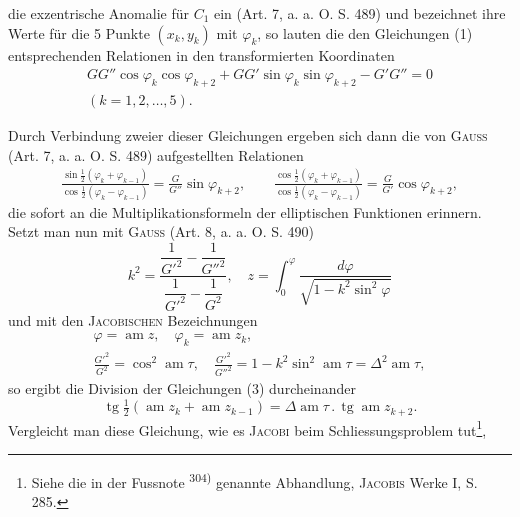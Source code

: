 die exzentrische Anomalie für \(C_1\) ein (Art. 7, a. a. O. S. 489) und bezeichnet
ihre Werte für die 5 Punkte \((x_k,y_k)\) mit \(\varphi_k\), so lauten die den Gleichungen
(1) entsprechenden Relationen in den transformierten Koordinaten
\begingroup\makeatletter\tagsleft@true\let\veqno\leqno\makeatother
\begin{equation*}
\begin{gathered}
GG''\cos\varphi_k\cos\varphi_{k+2}+GG'\sin\varphi_k\sin\varphi_{k+2}-G'G''=0\\
(k=1,2,\ldots,5).
\end{gathered}\tag*{(1\,a)}
\end{equation*}
\endgroup
\par\clearpage{}
\noindent Durch Verbindung zweier dieser Gleichungen ergeben sich dann die von
\textsc{Gauss} (Art. 7, a. a. O. S. 489) aufgestellten Relationen
\begingroup\makeatletter\tagsleft@true\let\veqno\leqno\makeatother
\begin{equation*}
\begin{gathered}
\frac{\sin\frac12(\varphi_k+\varphi_{k-1})}{\cos\frac12(\varphi_k-\varphi_{k-1})}=\frac G{G''}\sin\varphi_{k+2},\qquad
\frac{\cos\frac12(\varphi_k+\varphi_{k-1})}{\cos\frac12(\varphi_k-\varphi_{k-1})}=\frac G{G'}\cos\varphi_{k+2},
\end{gathered}\tag*{(3)}
\end{equation*}
\endgroup
die sofort an die Multiplikationsformeln der elliptischen Funktionen erinnern.
Setzt man nun mit \textsc{Gauss} (Art. 8, a. a. O. S. 490)
\[
k^2=\frac{\dfrac1{G'^2}-\dfrac1{G''^2}}{\dfrac1{G'^2}-\dfrac1{G^2}},\quad
z=\int_0^\varphi\frac{d\varphi}{\sqrt{1-k^2\sin^2\varphi}}
\]
und mit den \textsc{Jacobischen} Bezeichnungen
\[
\begin{gathered}
\varphi=\operatorname{am}z,\quad\varphi_k=\operatorname{am}z_k,\\
\frac{G'^2}{G^2}=\cos^2\operatorname{am}\tau,\quad
\frac{G'^2}{G''^2}=1-k^2\sin^2\operatorname{am}\tau=\Delta^2\operatorname{am}\tau,
\end{gathered}
\]
so ergibt die Division der Gleichungen (3) durcheinander
\[
\operatorname{tg}\tfrac12(\operatorname{am}z_k+\operatorname{am}z_{k-1})
=\Delta\operatorname{am}\tau\mathbin{.}\operatorname{tg}\operatorname{am}z_{k+2}.
\]
Vergleicht man diese Gleichung, wie es \textsc{Jacobi} beim Schliessungsproblem tut\footnote{Siehe die in der Fussnote \textsuperscript{304)} genannte Abhandlung, \textsc{Jacobis} Werke I, S. 285.},
